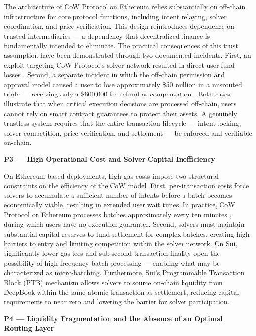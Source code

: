The architecture of CoW Protocol on Ethereum relies substantially on off-chain infrastructure for core protocol functions, including intent relaying, solver coordination, and price verification. This design reintroduces dependence on trusted intermediaries --- a dependency that decentralized finance is fundamentally intended to eliminate. The practical consequences of this trust assumption have been demonstrated through two documented incidents. First, an exploit targeting CoW Protocol's solver network resulted in direct user fund losses \cite{cowswapsolverexploit}. Second, a separate incident in which the off-chain permission and approval model caused a user to lose approximately \$50 million in a misrouted trade --- receiving only a \$600,000 fee refund as compensation \cite{sinclairCryptoTraderLoses2026}. Both cases illustrate that when critical execution decisions are processed off-chain, users cannot rely on smart contract guarantees to protect their assets. A genuinely trustless system requires that the entire transaction lifecycle --- intent locking, solver competition, price verification, and settlement --- be enforced and verifiable on-chain.

\textbf{P3 --- High Operational Cost and Solver Capital Inefficiency}

On Ethereum-based deployments, high gas costs impose two structural constraints on the efficiency of the CoW model. First, per-transaction costs force solvers to accumulate a sufficient number of intents before a batch becomes economically viable, resulting in extended user wait times. In practice, CoW Protocol on Ethereum processes batches approximately every ten minutes \cite{BatchHistoryDune2023}, during which users have no execution guarantee. Second, solvers must maintain substantial capital reserves to fund settlement for complex batches, creating high barriers to entry and limiting competition within the solver network. On Sui, significantly lower gas fees and sub-second transaction finality open the possibility of high-frequency batch processing --- enabling what may be characterized as micro-batching. Furthermore, Sui's Programmable Transaction Block (PTB) mechanism allows solvers to source on-chain liquidity from DeepBook within the same atomic transaction as settlement, reducing capital requirements to near zero and lowering the barrier for solver participation.

\textbf{P4 --- Liquidity Fragmentation and the Absence of an Optimal Routing Layer}

